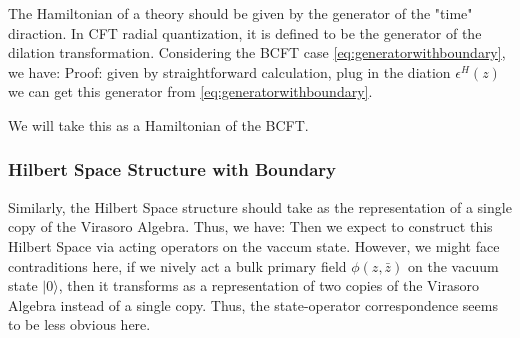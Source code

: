 The Hamiltonian of a theory should be given by the generator of the
"time" diraction. In CFT radial quantization, it is defined to be the
generator of the dilation transformation.
Considering the BCFT case \cref{eq:generatorwithboundary}, we have:
Proof: given by straightforward calculation, plug in the diation $
\epsilon^H(z) $we can get this generator from \cref{eq:generatorwithboundary}.

We will take this as a Hamiltonian of the BCFT.

\subsubsection{Hilbert Space Structure with Boundary}

Similarly, the Hilbert Space structure should take as the
representation of a single copy of the Virasoro Algebra. Thus, we have:
Then we expect to construct this Hilbert Space via acting operators
on the vaccum state. However, we might face contraditions here, if we
nively act a bulk primary field $ \phi(z,\bar{z}) $ on the vacuum
state $ |0\rangle $, then it transforms as a representation of two
copies of the Virasoro Algebra instead of a single copy. Thus, the
state-operator correspondence seems to be less obvious here.


